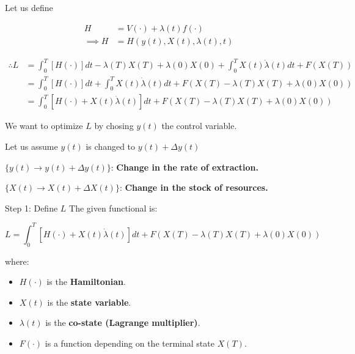 \documentclass[
  ignorenonframetext,
]{beamer}
\providecommand{\tightlist}{%
  \setlength{\itemsep}{0pt}\setlength{\parskip}{0pt}}\usepackage{longtable,booktabs,array}
\begin{document}
\begin{frame}
Let us define

\begin{align}
H &= V(\cdot) + \lambda(t)f(\cdot) \\
\implies H &= H(y(t), X(t), \lambda(t), t)
\end{align}

\begin{align}
\therefore L &= \int_0^T[H(\cdot)]dt - \lambda(T)X(T) + \lambda(0)X(0) + \int_0^T X(t)\dot{\lambda}(t)dt + F(X(T)) \\
&= \int_0^T[H(\cdot)]dt  + \int_0^T X(t)\dot{\lambda}(t)dt + F(X(T)- \lambda(T)X(T) + \lambda(0)X(0)) \\
&= \int_0^T\left[H(\cdot)  + X(t)\dot{\lambda}(t)\right]dt + F(X(T)- \lambda(T)X(T) + \lambda(0)X(0))
\end{align}

We want to optimize \(L\) by chosing \(y(t)\) the control variable.

Let us assume \(y(t)\) is changed to \(y(t) + \Delta y(t)\)

\(\{y(t) \to y(t) + \Delta y(t)\}\): \textbf{Change in the rate of
extraction.}

\(\{X(t) \to X(t) + \Delta X(t)\}\): \textbf{Change in the stock of
resources.}
\end{frame}

\begin{frame}{Step 1: Define \(L\)}
\label{step-1-define-l}
The given functional is:

\[
L = \int_0^T\left[H(\cdot)  + X(t)\dot{\lambda}(t)\right]dt + F(X(T)- \lambda(T)X(T) + \lambda(0)X(0))
\]

where:

\begin{itemize}
\tightlist
\item
  \(H(\cdot)\) is the \textbf{Hamiltonian}.
\item
  \(X(t)\) is the \textbf{state variable}.
\item
  \(\lambda(t)\) is the \textbf{co-state (Lagrange multiplier)}.
\item
  \(F(\cdot)\) is a function depending on the terminal state \(X(T)\).
\end{itemize}
\end{frame}
\end{document}
